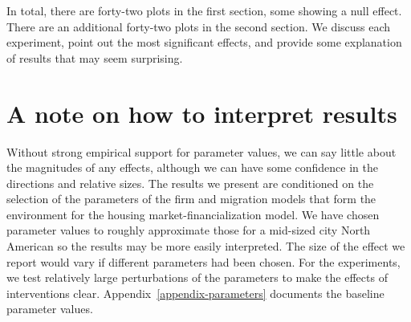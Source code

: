 
In total, there are forty-two plots in the first section, some showing a null effect. There are an additional forty-two plots in the second section. We discuss each experiment, point out the most significant effects, and provide some explanation of results that may seem surprising.  

\section{A note on how to interpret results}

Without strong empirical support for parameter values, we can say little about the magnitudes of any effects, although we can have some confidence in the directions and relative sizes.  
The results we present are conditioned on the selection of the parameters of the firm and migration models that form the environment for the housing market-financialization model. We have chosen parameter values to roughly approximate those for a mid-sized city North American so the results may be more easily interpreted. The size of the effect we report would vary if different parameters had been chosen. %
For the experiments, we test relatively large perturbations of the parameters to make the effects of interventions clear. Appendix~\ref{appendix-parameters} documents the baseline parameter values. 

